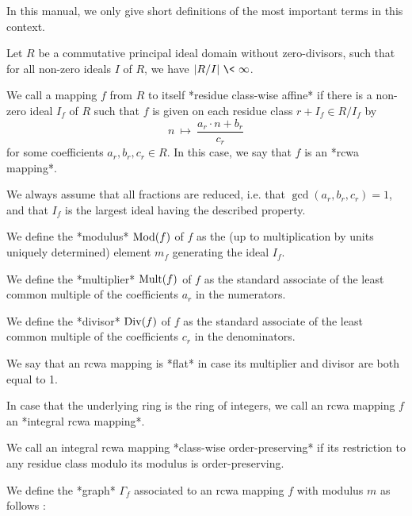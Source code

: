 

In this manual, we only give short definitions of the most important
terms in this context.

Let $R$ be a commutative principal ideal domain without zero-divisors,
such that for all non-zero ideals $I$ of $R$,
we have $|R/I| \ \< \ \infty$.

We call a mapping $f$ from $R$ to itself *residue class-wise affine*
if there is a non-zero ideal $I_f$ of $R$ such that $f$ is given on each
residue class $r + I_f \in R/I_f$ by
$$
  n \ \mapsto \ \frac{a_r \cdot n + b_r}{c_r} 
$$
for some coefficients $a_r, b_r, c_r \in R$.
In this case, we say that $f$ is an *rcwa mapping*.

We always assume that all fractions are reduced, i.e. that
$\gcd(a_r,b_r,c_r) = 1$, and that $I_f$ is the largest ideal having the
described property.

We define the *modulus* ${\rm Mod}(f)$ of $f$ as the
(up to multiplication by units uniquely determined) element $m_f$
generating the ideal $I_f$.

We define the *multiplier* ${\rm Mult}(f)$ of $f$ as the standard
associate of the least common multiple of the coefficients $a_r$ in the
numerators.
 
We define the *divisor* ${\rm Div}(f)$ of $f$ as the standard
associate of the least common multiple of the coefficients $c_r$ in the
denominators.

We say that an rcwa mapping is *flat* in case its multiplier
and divisor are both equal to 1.

In case that the underlying ring is the ring of integers, we call an
rcwa mapping $f$ an *integral rcwa mapping*.

We call an integral rcwa mapping *class-wise order-preserving* if its
restriction to any residue class modulo its modulus is order-preserving.

We define the *graph* $\Gamma_f$ associated to an rcwa mapping $f$ with 
modulus $m$ as follows :
\beginlist

